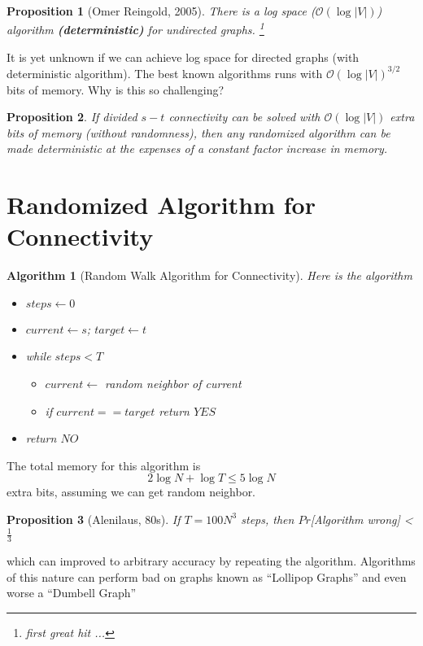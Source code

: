 \documentclass[11pt]{book}
\newtheorem{algorithm}{Algorithm}[chapter]
\newtheorem{proposition}{Proposition}[chapter]
\begin{document}
\begin{proposition}[Omer Reingold, 2005]
	There is a log space ($\mathcal O ( \log | V | )$) algorithm \textbf{(deterministic)} for undirected graphs. \footnote{first great hit ...}
\end{proposition}

It is yet unknown if we can achieve log space for directed graphs (with deterministic algorithm). The best known algorithms runs with $\mathcal O (\log |V| ) ^{3/2}$ bits of memory. Why is this so challenging? 

\begin{proposition}
	If divided $s-t$ connectivity can be solved with $\mathcal O (\log |V| )$ extra bits of memory (without randomness), then any randomized algorithm can be made deterministic at the expenses of a constant factor increase in memory. 
\end{proposition}

\section{Randomized Algorithm for Connectivity}
\begin{algorithm}[Random Walk Algorithm for Connectivity] Here is the algorithm
	\begin{itemize}
		\item $steps \gets 0 $ 
		\item $current \gets s$; $target \gets t$
		\item while $steps < T$
		\begin{itemize}
			\item $current \gets $ random neighbor of current
			\item if $current == target$ return $YES$
		\end{itemize}
		\item return $NO$
	\end{itemize}
\end{algorithm}
The total memory for this algorithm is 
\begin{equation}
	2 \log N + \log T \leq 5 \log N
\end{equation}
extra bits, assuming we can get random neighbor. 

\begin{proposition}[Alenilaus, 80s]
	If $T = 100N^3$ steps, then $Pr$[Algorithm wrong] < $\frac{1}{3}$
\end{proposition}
which can improved to arbitrary accuracy by repeating the algorithm. Algorithms of this nature can perform bad on graphs known as ``Lollipop Graphs'' and even worse a ``Dumbell Graph''
\end{document}
